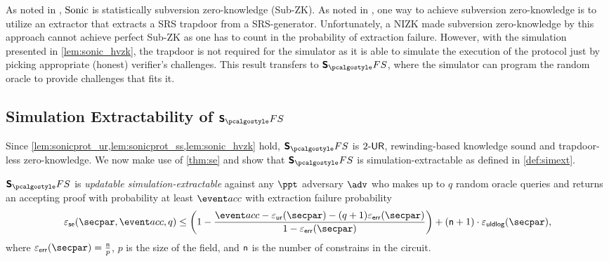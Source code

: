 \begin{remark} 
  As noted in \cite{CCS:MBKM19}, ${\textnormal{{Sonic}}}$ is statistically subversion zero-knowledge (Sub-ZK). As noted in \cite{AC:ABLZ17short}, one way to achieve
  subversion zero-knowledge is to utilize an extractor that extracts a SRS
  trapdoor from a SRS-generator. Unfortunately, a NIZK made subversion
  zero-knowledge by this approach cannot achieve perfect Sub-ZK as one has to
  count in the probability of extraction failure. However, with the simulation
  presented in \cref{lem:sonic_hvzk}, the trapdoor is not required for the
  simulator as it is able to simulate the execution of the protocol just by
  picking appropriate (honest) verifier's challenges. This result transfers to
  $\sonicprotfs$, where the simulator can program the random oracle to provide
  challenges that fits it.
\end{remark}


\subsection{Simulation Extractability of $\sonicprotfs$}
Since \cref{lem:sonicprot_ur,lem:sonicprot_ss,lem:sonic_hvzk} hold, $\sonicprotfs$ is ${2\text{-}\mathsf{UR}}$, rewinding-based knowledge sound and trapdoor-less zero-knowledge. We now make use
of \cref{thm:se} and show that $\sonicprotfs$ is simulation-extractable as defined in \cref{def:simext}.

\begin{corollary}
  \label{thm:sonicprotfs_se}
  $\sonicprotfs$ is \emph{updatable simulation-extractable} against any $\ppt$ adversary $\advse$ who makes up to $q$ random oracle queries and returns an accepting proof with probability at least $\accProb$ with extraction failure probability 
\[
  \epsse(\secpar, \accProb, q) \leq \left(1 - \frac{\accProb - \epsur (\secpar) - (q + 1) \epserr (\secpar)} {1 - \epserr (\secpar)}\right) + (\noofc + 1) \cdot \epsuldlog (\secpar) ,
\]
where $\epserr (\secpar) = \frac{\noofc}{p}$, $p$ is the size of the field, and $\mathsf{n}$ is the number of constrains in the circuit. 
\end{corollary}

